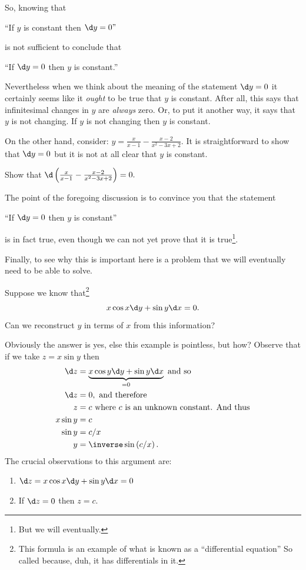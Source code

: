 So, knowing that\\
\centerline{``If $y$ is constant then $\d y=0"$} is not sufficient
to conclude that\\
\centerline{``If $\d y=0$ then $y$ is constant.''}
Nevertheless when we think about the meaning of the statement $\d y=0$
it certainly seems like it \emph{ought} to be true that $y$ is
constant. After all, this says that infinitesimal changes in $y$ are
\emph{always}  zero. Or, to put it another way, it says that $y$ is
not changing. If $y$ is not changing then $y$ is constant.

On the other hand, consider: \(y=\frac{x}{x-1}-\frac{x-2}{x^2-3x+2}.\)
It is straightforward to show that $\d y=0$ but it is not at all clear
that $y$ is constant.

\begin{embeddedproblem}{}
  Show that $\d\left(\frac{x}{x-1}-\frac{x-2}{x^2-3x+2}\right)=0.$
\end{embeddedproblem}

The point of the foregoing discussion is to convince you that the
statement\\
\centerline{``If $\d y=0$ then $y$ is constant''}
is in fact true, even though we can not yet prove that it is true\footnote{But
we will eventually.}.

Finally, to see why this is important here is a problem that we will
eventually need to be able to solve.
\begin{myexample}{}
  \label{ex:exact-differential}
  Suppose we know that\footnote{This formula is an example of what is
    known as a ``differential equation'' So called because, duh, it
    has differentials in it.}
\[ x\cos x\d y +\sin y\d x =0.\]  Can we reconstruct $y$ in terms of $x$ from
this information?

Obviously the answer is yes, else this example is pointless, but how?
Observe that if we take $z=x\sin y$ then 
\begin{align*}
\d z &= \underbrace{x\cos y\d y +\sin y\d x}_{=0} \text{ and so}\\
 \d z &=0, \text{ and therefore}\\
        z&=c \text{ where $c$ is an unknown constant. And thus}\\
  x\sin y&=c\\
  \sin y &=c/x\\
  y&=\inverse\sin\left(c/x\right).
\end{align*}
The crucial observations to this argument are:
\begin{enumerate}
\item $\d z = x\cos x\d y +\sin y\d x =0$
\item If $\d z = 0$ then $z=c.$
\end{enumerate}
\end{myexample}

